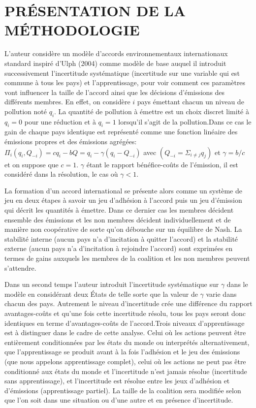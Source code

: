 \documentclass[12pt]{article}
\begin{document}
\section{PRÉSENTATION DE LA MÉTHODOLOGIE}
\par L'auteur considère un modèle d'accords environnementaux internationaux standard inspiré d'Ulph (2004) comme modèle de base auquel il introduit successivement l'incertitude systématique (incertitude sur une variable qui est commune à tous les pays) et l'apprentissage, pour voir comment ces paramètres vont influencer la taille de l'accord ainsi que les décisions d'émissions des différents membres. En effet, on considère $i$ pays émettant chacun un niveau de pollution noté $q_{i}$. La quantité de pollution à émettre est un choix discret limité à $q_i=0$ pour une réduction et à $q_i=1$  lorsqu'il s'agit de la pollution.Dans ce cas le gain de chaque pays identique est représenté comme une fonction linéaire des émissions propres et des émissions agrégées:
$\Pi_i(q_i,Q_{-i})=cq_i-bQ=q_i-\gamma(q_i-Q_{-i})$
avec $( Q_{-i} = \Sigma_{i\neq j} q_j )$ et $\gamma=b/c$ et on suppose que $c=1$.
\newline $\gamma$ étant le rapport bénéfice-coûts de l'émission, il est considéré dans la résolution, le cas où $\gamma<1$.
\par La formation d'un accord international se présente alors comme un système de jeu en deux étapes à savoir un jeu d'adhésion à l'accord puis un jeu d'émission qui décrit les quantités à émettre. Dans ce dernier cas les membres décident ensemble des émissions et les non membres décident individuellement et de manière non coopérative de sorte qu'on débouche sur un équilibre de Nash. La stabilité interne (aucun pays n'a d'incitation à quitter l'accord) et la stabilité externe (aucun pays n'a d'incitation à rejoindre l'accord) sont exprimées en termes de gains auxquels les membres de la coalition et les non membres peuvent s'attendre.
\par Dans un second temps l'auteur introduit l'incertitude systématique sur $\gamma$ dans le modèle en considérant deux États de telle sorte que la valeur de $\gamma$ varie dans chacun des pays. Autrement le niveau d'incertitude crée une différence du rapport avantages-coûts et qu'une fois cette incertitude résolu, tous les pays seront donc identiques en terme d'avantages-coûts de l'accord.Trois niveaux d'apprentissage est à distinguer dans le cadre de cette analyse. Celui où les actions peuvent être entièrement conditionnées par les états du monde ou interprétés alternativement, que l'apprentissage se produit avant à la fois l'adhésion et le jeu des émissions (que nous appelons apprentissage complet), celui où les actions ne peut pas être conditionné aux états du monde et l'incertitude n'est jamais résolue (incertitude sans apprentissage), et l'incertitude est résolue entre les jeux d'adhésion et d'émissions (apprentissage partiel). La taille de la coalition sera modifiée selon que l'on soit dans une situation ou d'une autre et  en présence d'incertitude.
\end{document}
